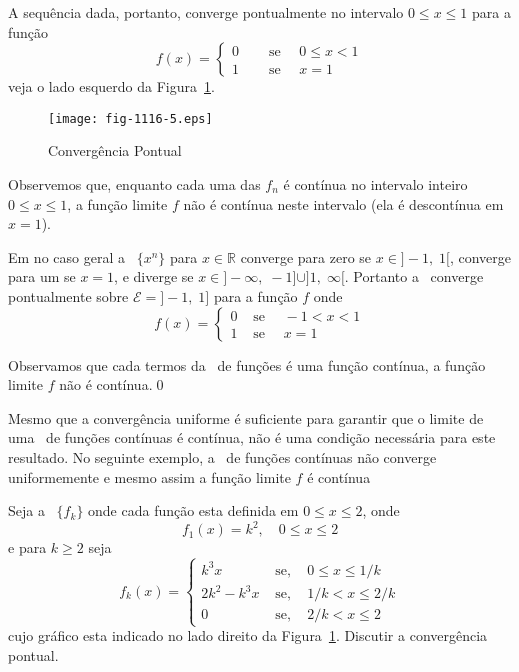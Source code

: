 A sequência dada, portanto, converge pontualmente no intervalo $0
\leq  x \leq 1$ para a função
\begin{equation*}
  f(x) =
    \begin{cases}
      0 & \quad \text{ se } \quad 0\leq x < 1 \\[2ex]
      1 & \quad \text{ se }\quad x=1
    \end{cases}
\end{equation*}
veja o lado esquerdo da Figura~\ref{fig-1116-5}.
\begin{figure}[H]
\centering
\texttt{[image: fig-1116-5.eps]}
\caption{Convergência Pontual}
\label{fig-1116-5}
\end{figure}

Observemos que, enquanto cada uma das $f_n$ é contínua no
intervalo inteiro $0 \leq x \leq 1$, a função limite $f$ não é
contínua neste intervalo (ela é descontínua em $x = 1$).

Em no caso geral a \seq\ $\{x^n\}$ para $x\in \mathbb{R}$ converge
para zero se $x\in ]-1, \; 1[$, converge para um se $x=1$, e diverge
se $x\in ]-\infty, \; -1]\cup ]1, \; \infty[$. Portanto a \seq\ converge
pontualmente sobre $\mathcal{E}=]-1,\; 1]$ para a função $f$ onde
\begin{equation*}
  f(x) =
    \begin{cases}
      0 & \text{ se } \quad -1< x < 1 \\[2ex]
      1 & \text{ se } \quad x=1
    \end{cases}
\end{equation*}

Observamos que cada termos da \seq\ de funções é uma função
contínua, a função limite $f$ não é contínua.\qed

Mesmo que a convergência uniforme é suficiente para garantir que o
limite de uma \seq\ de funções contínuas é contínua, não é uma
condição necessária para este resultado. No seguinte exemplo, a
\seq\ de funções contínuas não converge uniformemente e mesmo
assim a função limite $f$ é contínua

\begin{exer}\label{ex1116-2}
Seja a \seq\ $\{f_k\}$ onde cada função esta definida em $0\leq x
\leq 2$, onde
\begin{equation*}
    f_1(x)=k^2,\quad 0\le x\le 2
\end{equation*}
e para $k\ge 2$ seja
\begin{equation*}
  f_k(x) =
    \begin{cases}
      k^3x & \text{ se}, \quad 0\le x \le 1/k \\[2ex]
      2k^2-k^3x & \text{ se},\quad 1/k<x\le 2/k\\[2ex]
      0 &\text{ se}, \quad  2/k<x\le 2
    \end{cases}
\end{equation*}
cujo gráfico esta indicado no lado direito da
Figura~\ref{fig-1116-5}. Discutir a convergência pontual.
\end{exer}

